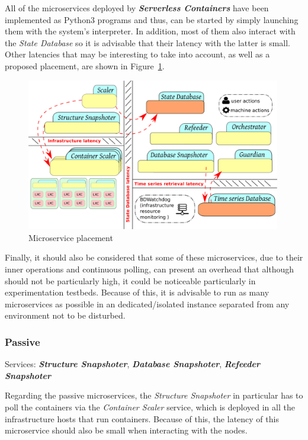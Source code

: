 \documentclass[12pt]{article}
\begin{document}
All of the microservices deployed by \textbf{\textit{Serverless Containers}} have been implemented as Python3 programs and thus, can be started by simply launching them with the system's interpreter. In addition, most of them also interact with the \textit{State Database} so it is advisable that their latency with the latter is small. Other latencies that may be interesting to take into account, as well as a proposed placement, are shown in Figure~\ref{fig:MicroservicePlacement}.

\begin{figure}[!tb]
	\centering
	\includegraphics[width=0.99\textwidth]{../img/deployment/placement.png}
	\caption{Microservice placement}
	\label{fig:MicroservicePlacement}
\end{figure}

Finally, it should also be considered that some of these microservices, due to their inner operations and continuous polling, can present an overhead that although should not be particularly high, it could be noticeable particularly in experimentation testbeds. Because of this, it is advisable to run as many microservices as possible in an dedicated/isolated instance separated from any environment not to be disturbed.

\subsubsection{Passive}

Services: \textbf{\textit{Structure Snapshoter}}, \textbf{\textit{Database Snapshoter}}, \textbf{\textit{Refeeder Snapshoter}}

Regarding the passive microservices, the \textit{Structure Snapshoter} in particular has to poll the containers via the \textit{Container Scaler} service, which is deployed in all the infrastructure hosts that run containers. Because of this, the latency of this microservice should also be small when interacting with the nodes.
\end{document}
